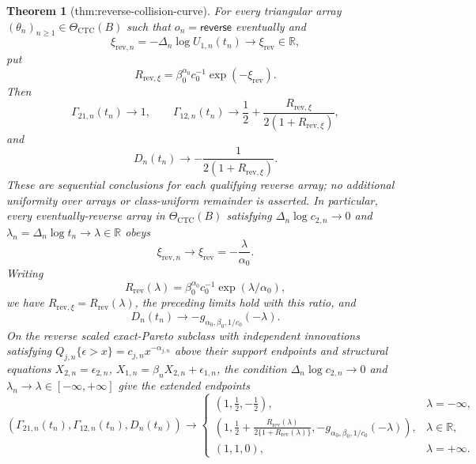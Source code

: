 \documentclass{article}
\newtheorem{theorem}{Theorem}
\begin{document}
\begin{theorem}[thm:reverse-collision-curve]\label{thm:reverse-collision-curve}
For every triangular array \((\theta_n)_{n\geq1}\in\Theta_{\mathrm{CTC}}(B)\) such that \(o_n=\mathsf{reverse}\) eventually and
\[
\xi_{\mathrm{rev},n}=-\Delta_n\log U_{1,n}(t_n)
\longrightarrow\xi_{\mathrm{rev}}\in\mathbb R,
\]
put
\[
R_{\mathrm{rev},\xi}
=\beta_0^{\alpha_0}c_0^{-1}\exp(-\xi_{\mathrm{rev}}).
\]
Then
\[
\Gamma_{21,n}(t_n)\longrightarrow1,
\qquad
\Gamma_{12,n}(t_n)\longrightarrow
\frac12+\frac{R_{\mathrm{rev},\xi}}{2(1+R_{\mathrm{rev},\xi})},
\]
and
\[
D_n(t_n)\longrightarrow-\frac{1}{2(1+R_{\mathrm{rev},\xi})}.
\]
These are sequential conclusions for each qualifying reverse array; no additional uniformity over arrays or class-uniform remainder is asserted. In particular, every eventually-reverse array in \(\Theta_{\mathrm{CTC}}(B)\) satisfying \(\Delta_n\log c_{2,n}\to0\) and \(\lambda_n=\Delta_n\log t_n\to\lambda\in\mathbb R\) obeys
\[
\xi_{\mathrm{rev},n}\longrightarrow\xi_{\mathrm{rev}}=-\frac{\lambda}{\alpha_0}.
\]
Writing
\[
R_{\mathrm{rev}}(\lambda)
=\beta_0^{\alpha_0}c_0^{-1}\exp(\lambda/\alpha_0),
\]
we have \(R_{\mathrm{rev},\xi}=R_{\mathrm{rev}}(\lambda)\), the preceding limits hold with this ratio, and
\[
D_n(t_n)\longrightarrow
-g_{\alpha_0,\beta_0,1/c_0}(-\lambda).
\]
On the reverse scaled exact-Pareto subclass with independent innovations satisfying \(Q_{j,n}\{\epsilon>x\}=c_{j,n}x^{-\alpha_{j,n}}\) above their support endpoints and structural equations \(X_{2,n}=\epsilon_{2,n}\), \(X_{1,n}=\beta_nX_{2,n}+\epsilon_{1,n}\), the condition \(\Delta_n\log c_{2,n}\to0\) and \(\lambda_n\to\lambda\in[-\infty,+\infty]\) give the extended endpoints
\[
(\Gamma_{21,n}(t_n),\Gamma_{12,n}(t_n),D_n(t_n))\longrightarrow
\begin{cases}
(1,\frac12,-\frac12), & \lambda=-\infty,\\
\left(1,\frac12+\frac{R_{\mathrm{rev}}(\lambda)}{2\{1+R_{\mathrm{rev}}(\lambda)\}},-g_{\alpha_0,\beta_0,1/c_0}(-\lambda)\right), & \lambda\in\mathbb R,\\
(1,1,0), & \lambda=+\infty.
\end{cases}
\]
\end{theorem}
\end{document}
